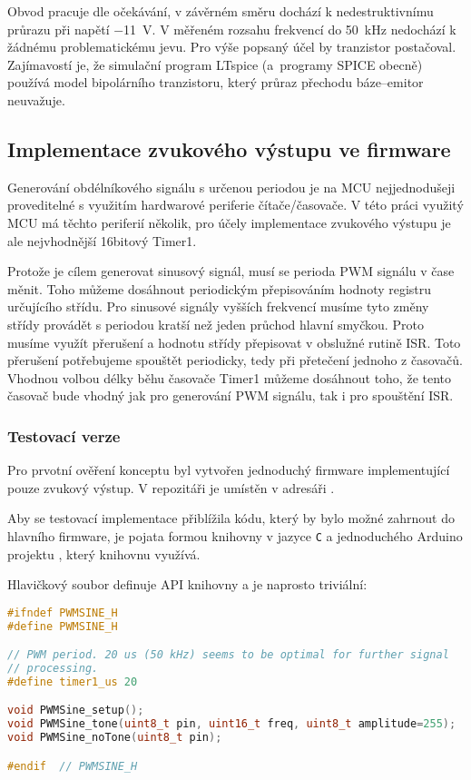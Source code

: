 Obvod pracuje dle očekávání, v závěrném směru dochází k nedestruktivnímu
průrazu při napětí \SI{-11}{\volt}. V měřeném rozsahu frekvencí do
\SI{50}{\kilo\hertz} nedochází k žádnému problematickému jevu. Pro výše popsaný
účel by tranzistor postačoval. Zajímavostí je, že simulační program LTspice
(a~programy SPICE obecně) používá model bipolárního tranzistoru, který průraz
přechodu báze--emitor neuvažuje.



\FloatBarrier  %
\subsection{Implementace zvukového výstupu ve firmware}
Generování obdélníkového signálu s určenou periodou je na MCU nejjednodušeji
proveditelné s využitím hardwarové periferie čítače/časovače. V této práci
využitý MCU má těchto periferií několik, pro účely implementace zvukového
výstupu je ale nejvhodnější 16bitový Timer1.

Protože je cílem generovat sinusový signál, musí se perioda PWM signálu v čase
měnit. Toho můžeme dosáhnout periodickým přepisováním hodnoty registru
určujícího střídu. Pro sinusové signály vyšších frekvencí musíme tyto změny
střídy provádět s periodou kratší než jeden průchod hlavní smyčkou. Proto
musíme využít přerušení a hodnotu střídy přepisovat v obslužné rutině ISR.
Toto přerušení potřebujeme spouštět periodicky, tedy při přetečení jednoho
z časovačů. Vhodnou volbou délky běhu časovače Timer1 můžeme dosáhnout toho, že
tento časovač bude vhodný jak pro generování PWM signálu, tak i pro spouštění
ISR.

\subsubsection{Testovací verze}
Pro prvotní ověření konceptu byl vytvořen jednoduchý firmware implementující
pouze zvukový výstup. V repozitáři  je umístěn v adresáři
.  %

Aby se testovací implementace přiblížila kódu, který by bylo možné zahrnout do
hlavního firmware, je pojata formou knihovny v jazyce \texttt{C} a jednoduchého
Arduino projektu , který knihovnu využívá.

Hlavičkový soubor  definuje API knihovny a je naprosto
triviální:
\begin{lstlisting}[language=C++,style=numbers]
#ifndef PWMSINE_H
#define PWMSINE_H

// PWM period. 20 us (50 kHz) seems to be optimal for further signal
// processing.
#define timer1_us 20

void PWMSine_setup();
void PWMSine_tone(uint8_t pin, uint16_t freq, uint8_t amplitude=255);
void PWMSine_noTone(uint8_t pin);

#endif  // PWMSINE_H
\end{lstlisting}

